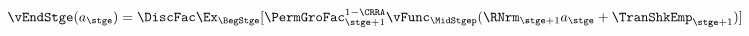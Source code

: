   \begin{equation}\begin{gathered}\begin{aligned}
        \vEndStge({a}_{\stge})  & = \DiscFac \Ex_{\BegStge}[\PermGroFac_{\stge+1}^{1-\CRRA}\null{\vFunc}_{\MidStgep}(\RNrm_{\stge+1} {a}_{\stge}+{\TranShkEmp}_{\stge+1})]  \label{eq:vEndtdefn}
      \end{aligned}\end{gathered}\end{equation}
